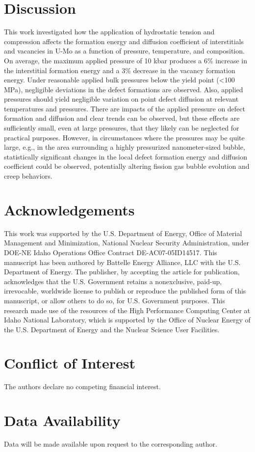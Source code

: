 \documentclass[11pt, oneside]{elsarticle}
\begin{document}
\section{Discussion}\label{sec4}
This work investigated how the application of hydrostatic tension and compression affects the formation energy and diffusion coefficient of interstitials and vacancies in U-Mo as a function of pressure, temperature, and composition. On average, the maximum applied pressure of 10 kbar produces a 6\% increase in the interstitial formation energy and a 3\% decrease in the vacancy formation energy. Under reasonable applied bulk pressures below the yield point (<100 MPa), negligible deviations in the defect formations are observed. Also, applied pressures should yield negligible variation on point defect diffusion at relevant temperatures and pressures. There are impacts of the applied pressure on defect formation and diffusion and clear trends can be observed, but these effects are sufficiently small, even at large pressures, that they likely can be neglected for practical purposes. However, in circumstances where the pressures may be quite large, e.g., in the area surrounding a highly pressurized nanometer-sized bubble, statistically significant changes in the local defect formation energy and diffusion coefficient could be observed, potentially altering fission gas bubble evolution and creep behaviors.

\section{Acknowledgements}\label{sec5}
This work was supported by the U.S. Department of Energy, Office of Material Management and Minimization, National Nuclear Security Administration, under DOE-NE Idaho Operations Office Contract DE-AC07-05ID14517. This manuscript has been authored by Battelle Energy Alliance, LLC with the U.S. Department of Energy. The publisher, by accepting the article for publication, acknowledges that the U.S. Government retains a nonexclusive, paid-up, irrevocable, worldwide license to publish or reproduce the published form of this manuscript, or allow others to do so, for U.S. Government purposes. This research made use of the resources of the High Performance Computing Center at Idaho National Laboratory, which is supported by the Office of Nuclear Energy of the U.S. Department of Energy and the Nuclear Science User Facilities.

\section{Conflict of Interest}\label{sec6}
The authors declare no competing financial interest.

\section{Data Availability}\label{sec7}
Data will be made available upon request to the corresponding author. 



\end{document}
